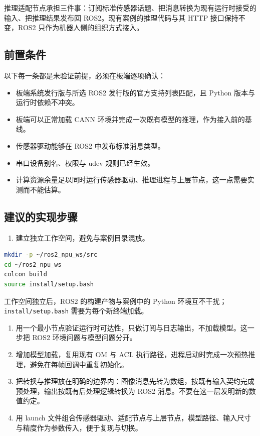 推理适配节点承担三件事：订阅标准传感器话题、把消息转换为现有运行时接受的输入、把推理结果发布回
ROS2。现有案例的推理代码与其 HTTP 接口保持不变，ROS2
只作为机器人侧的组织方式接入。

\subsection{前置条件}\label{ux524dux7f6eux6761ux4ef6}

以下每一条都是未验证前提，必须在板端逐项确认：

\begin{itemize}
\tightlist
\item
  板端系统发行版与所选 ROS2 发行版的官方支持列表匹配，且 Python
  版本与运行时依赖不冲突。
\item
  板端可以正常加载 CANN 环境并完成一次既有模型的推理，作为接入前的基线。
\item
  传感器驱动能够在 ROS2 中发布标准消息类型。
\item
  串口设备别名、权限与 udev 规则已经生效。
\item
  计算资源余量足以同时运行传感器驱动、推理进程与上层节点，这一点需要实测而不能估算。
\end{itemize}

\subsection{建议的实现步骤}\label{ux5efaux8baeux7684ux5b9eux73b0ux6b65ux9aa4}

\begin{enumerate}
\def\labelenumi{\arabic{enumi}.}
\tightlist
\item
  建立独立工作空间，避免与案例目录混放。
\end{enumerate}

\begin{lstlisting}[language=bash]
mkdir -p ~/ros2_npu_ws/src
cd ~/ros2_npu_ws
colcon build
source install/setup.bash
\end{lstlisting}

工作空间独立后，ROS2 的构建产物与案例中的 Python
环境互不干扰；\passthrough{\lstinline!install/setup.bash!}
需要为每个新终端加载。

\begin{enumerate}
\def\labelenumi{\arabic{enumi}.}
\setcounter{enumi}{1}
\item
  用一个最小节点验证运行时可达性，只做订阅与日志输出，不加载模型。这一步把
  ROS2 环境问题与模型问题分开。
\item
  增加模型加载，复用现有 OM 与 ACL
  执行路径，进程启动时完成一次预热推理，避免在每帧回调中重复初始化。
\item
  把转换与推理放在明确的边界内：图像消息先转为数组，按既有输入契约完成预处理，输出按既有后处理逻辑转换为
  ROS2 消息。不要在这一层发明新的数值约定。
\item
  用 launch
  文件组合传感器驱动、适配节点与上层节点，模型路径、输入尺寸与精度作为参数传入，便于复现与切换。
\end{enumerate}

